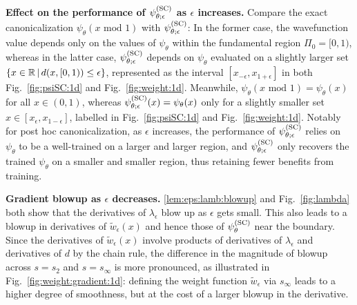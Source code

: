 \noindent
\textbf{Effect on the performance of $\psi^{(\rm SC)}_{\theta;\epsilon}$ as $\epsilon$ increases.} Compare the exact canonicalization $\psi_\theta(x \textrm{ mod } 1)$ with  $\psi^{(\rm SC)}_{\theta;\epsilon}$: In the former case, the wavefunction value depends only on the values of $\psi_\theta$ within the fundamental region $\Pi_0 = [0,1)$, whereas in the latter case, $\psi^{(\rm SC)}_{\theta;\epsilon}$ depends on $\psi_\theta$ evaluated on a slightly larger set $\{ x \in \mathbb{R}\,|\, d(x, [0,1)) \leq \epsilon\}$, represented as the interval $[x_{-\epsilon}, x_{1+\epsilon}]$ in both Fig.~\ref{fig:psiSC:1d} and Fig.~\ref{fig:weight:1d}. Meanwhile, $\psi_\theta(x \textrm{ mod } 1) = \psi_\theta(x)$ for all $x \in (0,1)$, whereas $\psi^{(\rm SC)}_{\theta;\epsilon}(x) = \psi_\theta(x)$ only for a slightly smaller set $x \in [x_\epsilon, x_{1-\epsilon}]$, labelled in Fig.~\ref{fig:psiSC:1d} and Fig.~\ref{fig:weight:1d}. Notably for post hoc canonicalization, as $\epsilon$ increases, the performance of $\psi^{(\rm SC)}_{\theta;\epsilon}$ relies on $\psi_\theta$ to be a well-trained on a larger and larger region, and $\psi^{(\rm SC)}_{\theta;\epsilon}$ only recovers the trained $\psi_\theta$ on a smaller and smaller region, thus retaining fewer benefits from training.

\vspace{.5em}

\noindent
\textbf{Gradient blowup as $\epsilon$ decreases.} \cref{lem:eps:lamb:blowup} and Fig.~\ref{fig:lambda} both show that the derivatives of $\lambda_\epsilon$ blow up as $\epsilon$ gets small. This also leads to a blowup in derivatives of $\tilde w_\epsilon(x)$ and hence those of $\psi^{(\rm SC)}_\theta$ near the boundary. Since the derivatives of $\tilde w_\epsilon(x)$  involve products of derivatives of $\lambda_\epsilon$ and derivatives of $d$ by the chain rule, the difference in the magnitude of blowup across $s=s_2$ and $s=s_\infty$ is more pronounced, as illustrated in Fig.~\ref{fig:weight:gradient:1d}: defining the weight function $\tilde w_\epsilon$ via $s_\infty$ leads to a higher degree of smoothness, but at the cost of a larger blowup in the derivative.

